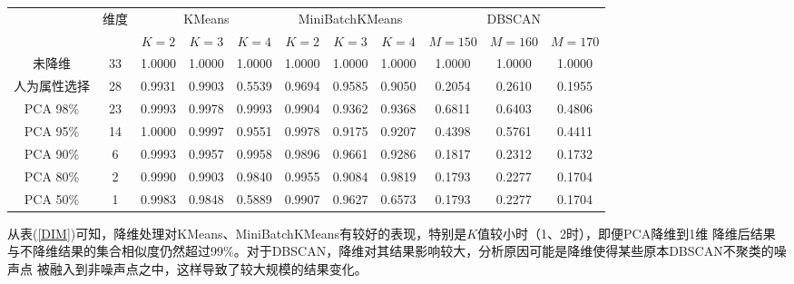 \documentclass{acm_proc_article-sp}
\begin{document}
\begin{table*}[!ht]
\small
\centering
\caption{降维对聚类算法影响评估}
\begin{tabular}{@{}c|c|ccc|ccc|ccc@{}}
\toprule
              &\multicolumn{1}{c|}{\multirow{2}{*}{维度}} & \multicolumn{3}{c|}{KMeans} & \multicolumn{3}{c|}{MiniBatchKMeans} & \multicolumn{3}{c}{DBSCAN} \\
              &\multicolumn{1}{c|}{}                     & $K=2$   & $K=3$   & $K=4$   & $K=2$      & $K=3$      & $K=4$      & $M=150$ & $M=160$ & $M=170$ \\ \midrule
未降维         & 33                                       & 1.0000  & 1.0000  & 1.0000  & 1.0000     & 1.0000     & 1.0000     & 1.0000  & 1.0000  & 1.0000  \\
人为属性选择    & 28                                       & 0.9931  & 0.9903  & 0.5539  & 0.9694     & 0.9585     & 0.9050     & 0.2054  & 0.2610  & 0.1955  \\
PCA 98\%      & 23                                       & 0.9993  & 0.9978  & 0.9993  & 0.9904     & 0.9362     & 0.9368     & 0.6811  & 0.6403  & 0.4806  \\
PCA 95\%      & 14                                       & 1.0000  & 0.9997  & 0.9551  & 0.9978     & 0.9175     & 0.9207     & 0.4398  & 0.5761  & 0.4411  \\
PCA 90\%      & 6                                        & 0.9993  & 0.9957  & 0.9958  & 0.9896     & 0.9661     & 0.9286     & 0.1817  & 0.2312  & 0.1732  \\ 
PCA 80\%      & 2                                        & 0.9990  & 0.9903  & 0.9840  & 0.9955     & 0.9084     & 0.9819     & 0.1793  & 0.2277  & 0.1704  \\ 
PCA 50\%      & 1                                        & 0.9983  & 0.9848  & 0.5889  & 0.9907     & 0.9627     & 0.6573     & 0.1793  & 0.2277  & 0.1704  \\ \bottomrule
\end{tabular}
\label{DIM}
\end{table*}

从表(\ref{DIM})可知，降维处理对KMeans、MiniBatchKMeans有较好的表现，特别是$K$值较小时（1、2时），即便PCA降维到1维
降维后结果与不降维结果的集合相似度仍然超过99\%。对于DBSCAN，降维对其结果影响较大，分析原因可能是降维使得某些原本DBSCAN不聚类的噪声点
被融入到非噪声点之中，这样导致了较大规模的结果变化。
\end{document}
